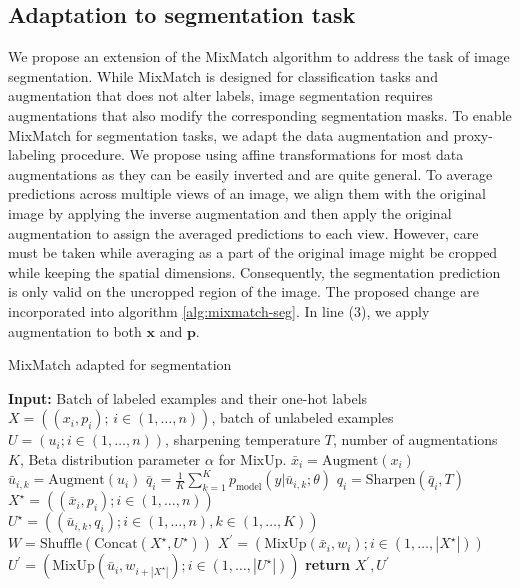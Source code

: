 \subsection{Adaptation to segmentation task}
We propose an extension of the MixMatch algorithm to address the task of image segmentation. While MixMatch is designed for classification tasks 
and augmentation that does not alter labels, image segmentation requires augmentations that also modify the corresponding segmentation masks. 
To enable MixMatch for segmentation tasks, we adapt the data augmentation and proxy-labeling procedure. We propose using affine transformations 
for most data augmentations as they can be easily inverted and are quite general. To average predictions across multiple views of an image, 
we align them with the original image by applying the inverse augmentation and then apply the original augmentation to assign the averaged 
predictions to each view. However, care must be taken while averaging as a part of the original image might be cropped while keeping the spatial dimensions.
Consequently, the segmentation prediction is only valid on the uncropped region of the image.
The proposed change are incorporated into algorithm \ref{alg:mixmatch-seg}. In line (3), we apply augmentation to both $\mathbf{x}$ and $\mathbf{p}$.
\begin{algorithm}[H]
    \caption{MixMatch adapted for segmentation}
    \label{alg:mixmatch-seg}
    \begin{algorithmic}[2]
      \State \textbf{Input:} Batch of labeled examples and their one-hot labels $X = ((x_i, p_i);\,i \in (1, \dots, n))$, batch of unlabeled examples $U = (u_i; i \in (1, \dots, n))$, sharpening temperature $T$, number of augmentations $K$, Beta distribution parameter $\alpha$ for MixUp.
       \State $\bar{x}_i = \text{Augment}(x_i)$ 
        \State $\bar{u}_{i,k} = \text{Augment}(u_i)$ 
       \EndFor
       \State $\bar{q}_i = \frac{1}{K} \sum_{k=1}^{K} p_{\text{model}}(y|\bar{u}_{i,k}; \theta)$ 
       \State $q_i = \text{Sharpen}(\bar{q}_i, T)$ 
      \EndFor
      \State $X^\star = ((\bar{x}_i, p_i); i \in (1, \dots, n))$ 
      \State $U^\star = ((\bar{u}_{i,k}, q_i); i \in (1, \dots, n), k \in (1, \dots, K))$ 
      \State $W = \text{Shuffle}(\text{Concat}(X^\star, U^\star))$ 
      \State $X^\prime = (\text{MixUp}(\bar{x}_i, w_i); i \in (1, \dots, |X^\star|))$ 
      \State $U^\prime = (\text{MixUp}(\bar{u}_{i}, w_{i+|X^\star|}); i \in (1, \dots, |U^\star|))$ 
      \State \textbf{return} $X^\prime, U^\prime$
      
    \end{algorithmic}
   \end{algorithm}